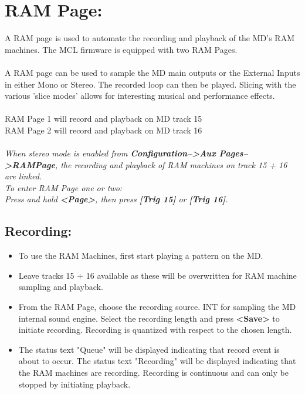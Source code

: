 \chapter{RAM Page:}
A RAM page is used to automate the recording and playback of the MD's RAM machines. The MCL firmware is equipped with two RAM Pages.
\\\\
A RAM page can be used to sample the MD main outputs or the External Inputs in either Mono or Stereo. The recorded loop can then be played.
Slicing with the various 'slice modes' allows for interesting musical and performance effects.
\\\\
RAM Page 1 will record and playback on MD track 15\\
RAM Page 2 will record and playback on MD track 16\\
\\
\textit{When stereo mode is enabled from \textbf{Configuration-->Aux Pages-->RAMPage}, the recording and playback of RAM machines on track 15 + 16 are linked.}
\\
\textit{To enter RAM Page one or two: \\Press and hold
\textbf{<Page>}, then press \textbf{[Trig 15]} or \textbf{[Trig 16]}.}

\newpage
\section{Recording:}
\begin{itemize}
    \item{To use the RAM Machines, first start playing a pattern on the MD.}
    \item{Leave tracks 15 + 16 available as these will be overwritten for RAM machine sampling and playback.}
    \item{From the RAM Page, choose the recording source. INT for sampling the MD internal sound engine. Select the recording length and press \textbf{<Save>} to initiate recording. Recording is quantized with respect to the chosen length.}
    \item The status text "Queue" will be displayed indicating that record event is about to occur. The status text "Recording" will be displayed indicating that the RAM machines are recording. Recording is continuous and can only be stopped by initiating playback.
\end{itemize}

